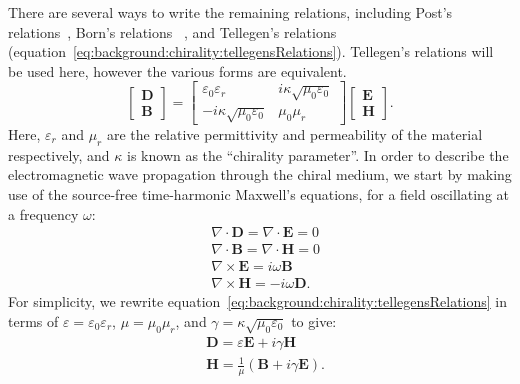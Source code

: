There are several ways to write the remaining relations, including Post's relations~\cite{Capolino2009}, Born's relations~\cite{Lekner1999, Barnett2016} , and Tellegen's relations~\cite{Capolino2009,kong1986,lindell1994} (equation~\ref{eq:background:chirality:tellegensRelations}). Tellegen's relations will be used here, however the various forms are equivalent.
\begin{equation}\label{eq:background:chirality:tellegensRelations}
    \begin{bmatrix}
        \mathbf{D} \\
        \mathbf{B}
    \end{bmatrix}
    =
    \begin{bmatrix}
        \varepsilon_0 \varepsilon_r & i \kappa \sqrt{\mu_0 \varepsilon_0} \\
        -i \kappa \sqrt{\mu_0 \varepsilon_0} & \mu_0 \mu_r
    \end{bmatrix}
    \begin{bmatrix}
        \mathbf{E} \\
        \mathbf{H}
    \end{bmatrix}.
\end{equation}
Here, ${{\varepsilon }_{r}}$ and $\mu_r$ are the relative permittivity and permeability of the material respectively, and $\kappa$ is known as the ``chirality parameter''. In order to describe the electromagnetic wave propagation through the chiral medium, we start by making use of the source-free time-harmonic Maxwell's equations, for a field oscillating at a frequency $\omega$:
\begin{align}
    & \nabla \cdot \mathbf{D} = \nabla \cdot \mathbf{E} = 0 \label{eq:background:chirality:maxwellD}\\
    & \nabla \cdot \mathbf{B} = \nabla \cdot \mathbf{H} = 0 \label{eq:background:chirality:maxwellB}\\
    & \nabla \times \mathbf{E} = i \omega \mathbf{B} \label{eq:background:chirality:maxwellE}\\
    & \nabla \times \mathbf{H} = -i \omega \mathbf{D} \label{eq:background:chirality:maxwellH}.
\end{align}
For simplicity, we rewrite equation~\ref{eq:background:chirality:tellegensRelations} in terms of $\varepsilon = \varepsilon_0 \varepsilon_r$, $\mu = \mu_0 \mu_r$, and $\gamma = \kappa \sqrt{\mu_0 \varepsilon_0}$ to give:
\begin{align}
    & \mathbf{D} = \varepsilon \mathbf{E} + i \gamma \mathbf{H} \label{eq:background:chirality:tellegensSimplifiedD} \\
    & \mathbf{H} = \frac{1}{\mu}( \mathbf{B} + i \gamma \mathbf{E} ) \label{eq:background:chirality:tellegensSimplifiedH}.
\end{align}
